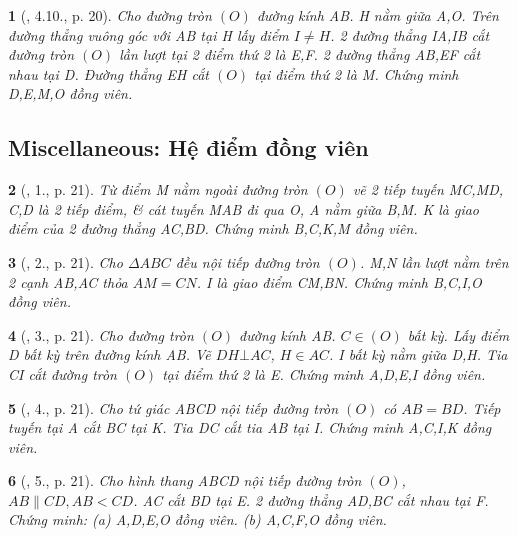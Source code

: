\documentclass{article}
\newtheorem{baitoan}{}
\begin{document}
\begin{baitoan}[\cite{Thu_Chung_Viet_Minh_circ}, 4.10., p. 20]
	Cho đường tròn $(O)$ đường kính AB. H nằm giữa A,O. Trên đường thẳng vuông góc với AB tại H lấy điểm $I\ne H$. 2 đường thẳng IA,IB cắt đường tròn $(O)$ lần lượt tại 2 điểm thứ 2 là E,F. 2 đường thẳng AB,EF cắt nhau tại D. Đường thẳng EH cắt $(O)$ tại điểm thứ 2 là M. Chứng minh D,E,M,O đồng viên.
\end{baitoan}

\subsection{Miscellaneous: Hệ điểm đồng viên}

\begin{baitoan}[\cite{Thu_Chung_Viet_Minh_circ}, 1., p. 21]
	Từ điểm M nằm ngoài đường tròn $(O)$ vẽ 2 tiếp tuyến MC,MD, C,D là 2 tiếp điểm, \& cát tuyến MAB đi qua O, A nằm giữa B,M. K là giao điểm của 2 đường thẳng AC,BD. Chứng minh B,C,K,M đồng viên.
\end{baitoan}

\begin{baitoan}[\cite{Thu_Chung_Viet_Minh_circ}, 2., p. 21]
	Cho $\Delta ABC$ đều nội tiếp đường tròn $(O)$. M,N lần lượt nằm trên 2 cạnh AB,AC thỏa $AM = CN$. I là giao điểm CM,BN. Chứng minh B,C,I,O đồng viên.
\end{baitoan}

\begin{baitoan}[\cite{Thu_Chung_Viet_Minh_circ}, 3., p. 21]
	Cho đường tròn $(O)$ đường kính AB. $C\in(O)$ bất kỳ. Lấy điểm D bất kỳ trên đường kính AB. Vẽ $DH\bot AC$, $H\in AC$. I bất kỳ nằm giữa D,H. Tia CI cắt đường tròn $(O)$ tại điểm thứ 2 là E. Chứng minh A,D,E,I đồng viên.
\end{baitoan}

\begin{baitoan}[\cite{Thu_Chung_Viet_Minh_circ}, 4., p. 21]
	Cho tứ giác ABCD nội tiếp đường tròn $(O)$ có $AB = BD$. Tiếp tuyến tại A cắt BC tại K. Tia DC cắt tia AB tại I. Chứng minh A,C,I,K đồng viên.
\end{baitoan}

\begin{baitoan}[\cite{Thu_Chung_Viet_Minh_circ}, 5., p. 21]
	Cho hình thang ABCD nội tiếp đường tròn $(O)$, $AB\parallel CD,AB < CD$. AC cắt BD tại E. 2 đường thẳng AD,BC cắt nhau tại F. Chứng minh: (a) A,D,E,O đồng viên. (b) A,C,F,O đồng viên.
\end{baitoan}
\end{document}
